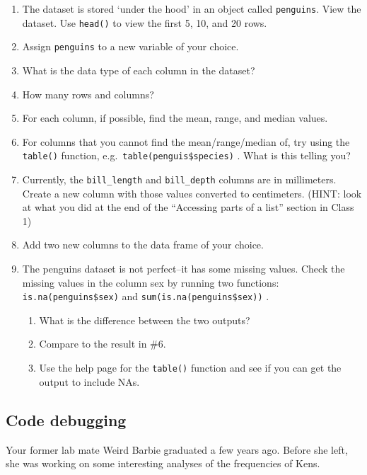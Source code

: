 \documentclass[
  letterpaper,
  DIV=11,
  numbers=noendperiod]{scrreprt}
\providecommand{\tightlist}{%
  \setlength{\itemsep}{0pt}\setlength{\parskip}{0pt}}\usepackage{longtable,booktabs,array}
\begin{document}
\begin{enumerate}
\def\labelenumi{\arabic{enumi}.}
\tightlist
\item
  The dataset is stored `under the hood' in an object called
  \texttt{penguins}. View the dataset. Use \texttt{head()} to view the
  first 5, 10, and 20 rows.
\item
  Assign \texttt{penguins} to a new variable of your choice.
\item
  What is the data type of each column in the dataset?
\item
  How many rows and columns?
\item
  For each column, if possible, find the mean, range, and median values.
\item
  For columns that you cannot find the mean/range/median of, try using
  the \texttt{table()} function, e.g.~\texttt{table(penguis\$species)} .
  What is this telling you?
\item
  Currently, the \texttt{bill\_length} and \texttt{bill\_depth} columns
  are in millimeters. Create a new column with those values converted to
  centimeters. (HINT: look at what you did at the end of the ``Accessing
  parts of a list'' section in Class 1)
\item
  Add two new columns to the data frame of your choice.
\item
  The penguins dataset is not perfect--it has some missing values. Check
  the missing values in the column sex by running two functions:
  \texttt{is.na(penguins\$sex)} and \texttt{sum(is.na(penguins\$sex))} .

  \begin{enumerate}
  \def\labelenumii{\alph{enumii}.}
  \tightlist
  \item
    What is the difference between the two outputs?
  \item
    Compare to the result in \#6.
  \item
    Use the help page for the \texttt{table()} function and see if you
    can get the output to include NAs.
  \end{enumerate}
\end{enumerate}

\subsection{Code debugging}\label{code-debugging}

Your former lab mate Weird Barbie graduated a few years ago. Before she
left, she was working on some interesting analyses of the frequencies of
Kens.
\end{document}
